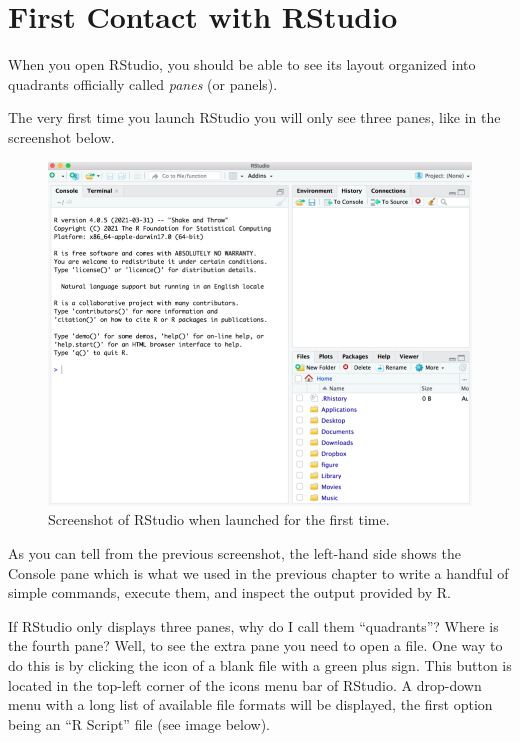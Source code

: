 \documentclass[
]{book}
\begin{document}
\hypertarget{first-contact-with-rstudio}{%
\section{First Contact with RStudio}\label{first-contact-with-rstudio}}

When you open RStudio, you should be able to see its layout organized into
quadrants officially called \emph{panes} (or panels).

The very first time you launch RStudio you will only see three panes, like in
the screenshot below.

\begin{figure}

{\centering \includegraphics[width=0.7\linewidth]{images/rstudio/rstudio-launch-first-time} 

}

\caption{Screenshot of RStudio when launched for the first time.}\label{fig:unnamed-chunk-24}
\end{figure}

As you can tell from the previous screenshot, the left-hand side shows the
Console pane which is what we used in the previous chapter to write a handful
of simple commands, execute them, and inspect the output provided by R.

If RStudio only displays three panes, why do I call them ``quadrants''? Where is
the fourth pane? Well, to see the extra pane you need to open a file. One
way to do this is by clicking the icon of a blank file with a green plus sign.
This button is located in the top-left corner of the icons menu bar of RStudio.
A drop-down menu with a long list of available file formats will be displayed,
the first option being an ``R Script'' file (see image below).
\end{document}
